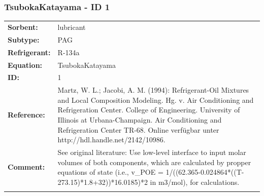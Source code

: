 \subsubsection{TsubokaKatayama - ID 1}
%
\begin{tabular}[l]{|lp{11.5cm}|}
\hline
\addlinespace

\textbf{Sorbent:} & lubricant \\
\textbf{Subtype:} & PAG \\
\textbf{Refrigerant:} & R-134a \\
\textbf{Equation:} & TsubokaKatayama \\
\textbf{ID:} & 1 \\
\textbf{Reference:} & Martz, W. L.; Jacobi, A. M. (1994): Refrigerant-Oil Mixtures and Local Composition Modeling. Hg. v. Air Conditioning and Refrigeration Center. College of Engineering. University of Illinois at Urbana-Champaign. Air Conditioning and Refrigeration Center TR-68. Online verfügbar unter http://hdl.handle.net/2142/10986. \\
\textbf{Comment:} & See original literature: Use low-level interface to input molar volumes of both components, which are calculated by propper equations of state (i.e., v\_POE =  1/((62.365-0.024864*((T-273.15)*1.8+32))*16.0185)*2 in m3/mol), for calculations. \\

\addlinespace
\hline
\end{tabular}
\newline

